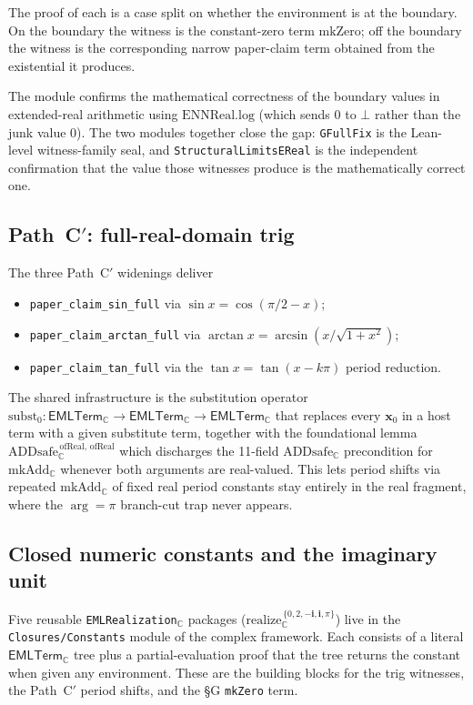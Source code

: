 \documentclass[11pt,a4paper]{article}
\theoremstyle{plain}
\theoremstyle{definition}
\newcommand{\C}{\mathbb{C}}
\newcommand{\imu}{\mathbf{i}}
\newcommand{\EMLTC}{\mathsf{EMLTerm}_\C}
\begin{document}
\noindent
The proof of each is a case split on whether the environment is at the
boundary. On the boundary the witness is the constant-zero term
$\mathrm{mkZero}$; off the boundary the witness is the corresponding
narrow paper-claim term obtained from the existential it produces.

The module  confirms the
mathematical correctness of the boundary values in extended-real
arithmetic using $\mathrm{ENNReal.log}$ (which sends $0$ to $\bot$
rather than the junk value $0$). The two modules together close the
gap: \texttt{GFullFix} is the Lean-level witness-family seal, and
\texttt{StructuralLimitsEReal} is the independent confirmation that
the value those witnesses produce is the mathematically correct one.

\subsection{\texorpdfstring{Path~C$'$}{Path C-prime}: full-real-domain trig}\label{sec:trig}

The three Path~C$'$ widenings deliver
\begin{itemize}[topsep=2pt, itemsep=1pt]
  \item \texttt{paper\_claim\_sin\_full} via
    $\sin x = \cos(\pi/2 - x)$;
  \item \texttt{paper\_claim\_arctan\_full} via
    $\arctan x = \arcsin(x / \sqrt{1 + x^2})$;
  \item \texttt{paper\_claim\_tan\_full} via the
    $\tan x = \tan(x - k\pi)$ period reduction.
\end{itemize}
\noindent
The shared infrastructure is the substitution operator
$\mathrm{subst}_0 : \EMLTC \to \EMLTC \to \EMLTC$ that replaces every
$\mathbf{x}_0$ in a host term with a given substitute term, together
with the foundational lemma $\mathrm{ADDsafe}_\C^{\,\mathrm{ofReal},\,
\mathrm{ofReal}}$ which discharges the 11-field
$\mathrm{ADDsafe}_\C$ precondition for $\mathrm{mkAdd}_\C$ whenever
both arguments are real-valued. This lets period shifts via repeated
$\mathrm{mkAdd}_\C$ of fixed real period constants stay entirely in
the real fragment, where the $\arg = \pi$ branch-cut trap never
appears.

\subsection{Closed numeric constants and the imaginary unit}

Five reusable \texttt{EMLRealization}$_\C$ packages
($\mathrm{realize}_\C^{\,\{0, 2, -\imu, \imu, \pi\}}$) live in the
\texttt{Closures/Constants} module of the complex framework. Each
consists of a literal $\EMLTC$ tree plus a partial-evaluation proof
that the tree returns the constant when given any environment. These
are the building blocks for the trig witnesses, the Path~C$'$ period
shifts, and the §G \texttt{mkZero} term.
\end{document}
